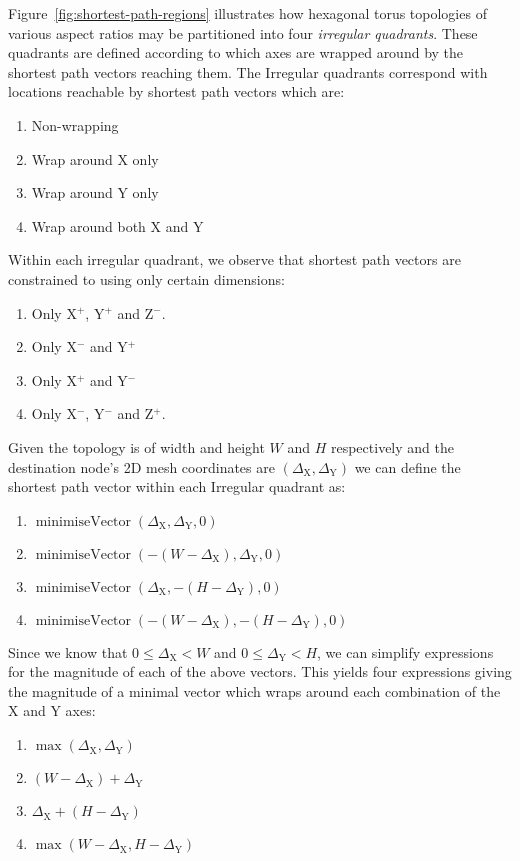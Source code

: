			Figure~\ref{fig:shortest-path-regions} illustrates how hexagonal torus
			topologies of various aspect ratios may be partitioned into four
			\emph{irregular quadrants}. These quadrants are defined according to which
			axes are wrapped around by the shortest path vectors reaching them. The
			Irregular quadrants correspond with locations reachable by shortest path
			vectors which are:
			\begin{enumerate}
				\item Non-wrapping
				\item Wrap around X only
				\item Wrap around Y only
				\item Wrap around both X and Y
			\end{enumerate}
			Within each irregular quadrant, we observe that shortest path vectors are
			constrained to using only certain dimensions:
			\begin{enumerate}
				\item Only X$^+$, Y$^+$ and Z$^-$.
				\item Only X$^-$ and Y$^+$
				\item Only X$^+$ and Y$^-$
				\item Only X$^-$, Y$^-$ and Z$^+$.
			\end{enumerate}
			Given the topology is of width and height $W$ and $H$ respectively and the
			destination node's 2D mesh coordinates are $(\Delta_\textrm{X},
			\Delta_\textrm{Y})$ we can define the shortest path vector within each
			Irregular quadrant as:
			\begin{enumerate}
				\item $\operatorname{minimiseVector}(\Delta_\textrm{X},\Delta_\textrm{Y},0)$
				\item $\operatorname{minimiseVector}(-(W-\Delta_\textrm{X}),\Delta_\textrm{Y},0)$
				\item $\operatorname{minimiseVector}(\Delta_\textrm{X},-(H-\Delta_\textrm{Y}),0)$
				\item $\operatorname{minimiseVector}(-(W-\Delta_\textrm{X}),-(H-\Delta_\textrm{Y}),0)$
			\end{enumerate}
			Since we know that $0 \le \Delta_\textrm{X} < W$ and $0 \le
			\Delta_\textrm{Y} < H$, we can simplify expressions for the magnitude of
			each of the above vectors. This yields four expressions giving the
			magnitude of a minimal vector which wraps around each combination of the
			X and Y axes:
			\begin{enumerate}
				\item $\operatorname{max}(\Delta_\textrm{X}, \Delta_\textrm{Y})$
				\item $(W - \Delta_\textrm{X}) + \Delta_\textrm{Y}$
				\item $\Delta_\textrm{X} + (H - \Delta_\textrm{Y})$
				\item $\operatorname{max}(W-\Delta_\textrm{X}, H-\Delta_\textrm{Y})$
			\end{enumerate}
